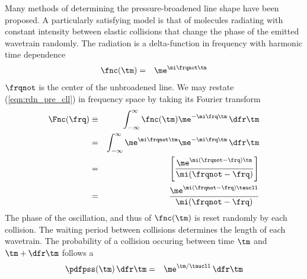 \documentclass[12pt]{article}
\begin{document}
Many methods of determining the pressure-broadened line shape have
been proposed.
A particularly satisfying model is that of molecules radiating with
constant intensity between elastic collisions that change the phase 
of the emitted wavetrain randomly.
The radiation is a delta-function in frequency with harmonic time
dependence
\begin{eqnarray}
\fnc(\tm) & = & \me^{\mi \frqnot \tm}
\label{eqn:rdn_pre_cll}
\end{eqnarray}
$\frqnot$ is the center of the unbroadened line.
We may restate (\ref{eqn:rdn_pre_cll}) in frequency space by taking
its Fourier transform
\begin{eqnarray}
\Fnc(\frq) & \equiv & \int_{-\infty}^{\infty} 
\fnc(\tm) \me^{-\mi \frq \tm} \,\dfr\tm \\
& = & \int_{-\infty}^{\infty} 
\me^{\mi \frqnot \tm} \me^{-\mi \frq \tm} \,\dfr\tm \nonumber \\
& = & \left[
\frac{\me^{\mi (\frqnot - \frq) \tm}}{\mi (\frqnot - \frq)} 
\right]_{}^{} \nonumber \\
& = & 
\frac{\me^{\mi (\frqnot - \frq) \taucll}}{\mi (\frqnot - \frq)} 
\nonumber \\
\label{eqn:rdn_pre_cll_frr}
\end{eqnarray}
The phase of the oscillation, and thus of $\fnc(\tm)$ is reset
randomly by each collision.
The waiting period between collisions determines the length of each
wavetrain.
The probability of a collision occuring between time 
$\tm$ and $\tm + \dfr\tm$ follows a 
\begin{eqnarray}
\pdfpss(\tm) \,\dfr\tm & = & \me^{\tm/\taucll} \,\dfr\tm
\label{eqn:pdf_pss_dfn}
\end{eqnarray}
\end{document}
